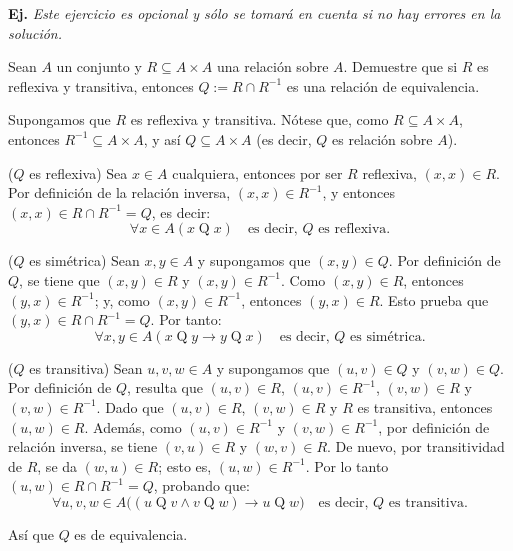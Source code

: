 \documentclass[letterpaper,DIV=14,headsepline,12pt]{scrartcl}
\makeatletter
\newcounter{Ejer}
\newcommand{\pts}{}
\newenvironment{ejercicio}[1]{\noindent
    \ifthenelse{\equal{#1}{1} \OR \equal{#1}{+1}}{\renewcommand{\pts}{\textbf{(#1 pt)}}}{\renewcommand{\pts}{\textbf{(#1 pts)}}}\textbf{Ej. \theEjer} \pts\stepcounter{Ejer}}{\vspace{.3cm}}
\renewenvironment{proof}[1][]{%
        \par\pushQED{\qed}%
        \normalfont\topsep6pt \partopsep0pt %
        \trivlist
        \item[\hskip\labelsep
                \textbf{\textit{Demostración.}}%
        ]#1
        }{%
        \popQED\endtrivlist\@endpefalse
    }
\makeatother
\begin{document}
    \begin{ejercicio}{+1}
      \textit{Este ejercicio es opcional y sólo se tomará en cuenta si no hay 
      errores en la solución.}

      Sean $A$ un conjunto y $R \subseteq A \times A$ una relación sobre $A$.
      Demuestre que si $R$ es reflexiva y transitiva, entonces $Q:=R \cap R^{-1}$
      es una relación de equivalencia.
    \end{ejercicio}
    \begin{proof}
        Supongamos que $R$ es reflexiva y transitiva. Nótese que, como $R \subseteq A \times A$, entonces $R^{-1} \subseteq A \times A$, y así $Q\subseteq A \times A$ (es decir, $Q$ es relación sobre $A$).
       
        ($Q$ es reflexiva) Sea $x \in A$ cualquiera, entonces por ser $R$ reflexiva, $(x,x) \in R$. Por definición de la relación inversa, $(x,x) \in R^{-1}$, y entonces $(x,x) \in R \cap R^{-1} = Q$, es decir:
        \[ \forall x \in A (x \mathrel{Q} x) \quad \text{es decir, $Q$ es reflexiva.} \]
        
        ($Q$ es simétrica) Sean $x,y \in A$ y supongamos que $(x,y) \in Q$. Por definición de $Q$, se tiene que $(x,y) \in R$ y $(x,y) \in R^{-1}$. Como $(x,y) \in R$, entonces $(y,x) \in R^{-1}$; y, como $(x,y) \in R^{-1}$, entonces $(y,x) \in R$. Esto prueba que $(y,x) \in R \cap R^{-1}=Q$. Por tanto:
        \[ \forall x,y \in A (x \mathrel{Q} y \to y \mathrel{Q} x) \quad \text{es decir, $Q$ es simétrica.}\]
        
        ($Q$ es transitiva) Sean $u,v,w \in A$ y supongamos que $(u,v) \in Q$ y $(v,w) \in Q$. Por definición de $Q$, resulta que $(u,v) \in R$, $(u,v) \in R^{-1}$, $(v,w) \in R$ y $(v,w) \in R^{-1}$. Dado que $(u,v) \in R$, $(v,w) \in R$ y $R$ es transitiva, entonces $(u,w) \in R$. Además, como $(u,v) \in R^{-1}$ y $(v,w) \in R^{-1}$, por definición de relación inversa, se tiene $(v,u) \in R$ y $(w,v) \in R$. De nuevo, por transitividad de $R$, se da $(w,u) \in R$; esto es, $(u,w) \in R^{-1}$. Por lo tanto $(u,w) \in R \cap R^{-1}=Q$, probando que:
        \[ \forall u,v,w \in A \big( (u \mathrel{Q} v \land v \mathrel{Q} w ) \to u \mathrel{Q} w \big) \quad \text{es decir, $Q$ es transitiva.} \]
        
        Así que $Q$ es de equivalencia.
    \end{proof}
\end{document}
